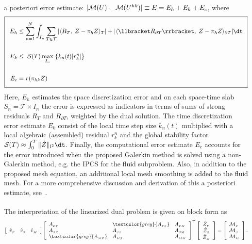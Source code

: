 a posteriori error estimate: $|\mathcal{M}(U) - \mathcal{M}(U^{hk})| \equiv E = E_h + E_k
+ E_c$, where
\begin{equation}
\label{selim:eq:aposteriori}
\addtolength{\fboxsep}{5pt} \boxed{
\begin{split}
E_h &\leq \sum_{n=1}^{N}\int_{I_n} \sum_{T\in\mathcal{T}}| \langle
R_T,\; Z - \pi_h Z \rangle_T |+ | \langle \llbracket R_{\partial T}
\rrbracket,\; Z - \pi_h Z \rangle _{\partial T}|\dt\\\\ E_k &\leq
\;\mathcal{S}(T)\max_{I_n}\;\{k_n(t) | r_k ^n|\}\\\\ E_c &=
r(\pi_{hk}Z)
\end{split}
}
\end{equation}
Here, $E_h$ estimates the space discretization error and on each
space-time slab $S_n = \mathcal{T} \times I_n$ the error is expressed
as indicators in terms of sums of strong residuals $R_T$ and
$R_{\partial T}$, weighted by the dual solution.  The time
discretization error estimate $E_k$ consist of the local time step
size $k_n(t)$ multiplied with a local algebraic (assembled) residual
$r_k^n$ and the global stability factor $\mathcal{S}(T) \approx
\int_0^T \| \dot{Z} \|_{l^2}\dt$. Finally, the computational error
estimate $E_c$ accounts for the error introduced when the proposed
Galerkin method is solved using a non-Galerkin method, e.g. the IPCS
for the fluid subproblem. Also, in addition to the proposed mesh
equation, an additional local mesh smoothing is added to the fluid mesh.
For a more comprehensive discussion and derivation of this a
posteriori estimate, see~\cite{SelimNarayananEtAl2010}.
\\\\
The interpretation of the linearized dual problem is given on block form as
\begin{eqnarray}
\label{selim:eq:dualsystem}
\left[\begin{array}{ccc} \hat{v}_{_{F}} & \hat{v}_{_{S}} & \hat{v}_{_{M}}
  \end{array} \right]
\left[\begin{array}{lll} \AFF & \textcolor{grey}{\AFS} & \AFM
    \\ \ASF & \ASS & \ASM \\ \textcolor{grey}{\AMF} & \AMS &
    \AMM
\end{array} \right]^{\top}
\left[ \begin{array}{c} \hat{Z}_{_{F}} \\ \hat{Z}_{_{S}}
    \\ \hat{Z}_{_{M}} \end{array} \right] =\left[ \begin{array}{l}
    \M_{_{F}}\\ \M_{{_S}}\\ \M_{_{M}} \end{array} \right].
\end{eqnarray}
